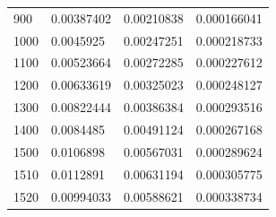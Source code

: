 \begin{center}
\begin{longtable}{l|l|l|l}
900                                                    & 0.00387402                                                        & 0.00210838                                               & 0.000166041                                                        \\
1000                                                   & 0.0045925                                                         & 0.00247251                                               & 0.000218733                                                        \\
1100                                                   & 0.00523664                                                        & 0.00272285                                               & 0.000227612                                                        \\
1200                                                   & 0.00633619                                                        & 0.00325023                                               & 0.000248127                                                        \\
1300                                                   & 0.00822444                                                        & 0.00386384                                               & 0.000293516                                                        \\
1400                                                   & 0.0084485                                                         & 0.00491124                                               & 0.000267168                                                        \\
1500                                                   & 0.0106898                                                         & 0.00567031                                               & 0.000289624                                                        \\
1510                                                   & 0.0112891                                                         & 0.00631194                                               & 0.000305775                                                        \\
1520                                                   & 0.00994033                                                        & 0.00588621                                               & 0.000338734                                                        \\

\end{longtable}
\end{center}
